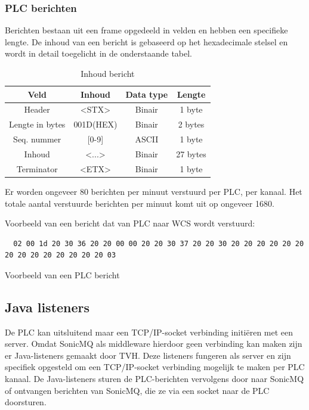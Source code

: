 \subsubsection{PLC berichten}
Berichten bestaan uit een frame opgedeeld in velden en hebben een specifieke lengte.
De inhoud van een bericht is gebaseerd op het hexadecimale stelsel en wordt in detail toegelicht in de onderstaande tabel.
\begin{table}[h!]
\centering 
\begin{tabular}{|c|c|c|c|}
  \hline
  \textbf{Veld} & \textbf{Inhoud} & \textbf{Data type} & \textbf{Lengte} \\
  \hline 
  Header & <STX> & Binair & 1 byte \\
  \hline 
  Lengte in bytes & 001D(HEX) & Binair & 2 bytes \\
  \hline 
  Seq. nummer &  [0-9] & ASCII & 1 byte  \\
  \hline 
  Inhoud & <...> & Binair & 27 bytes \\
  \hline 
  Terminator & <ETX> & Binair & 1 byte \\
  \hline
\end{tabular}
\caption[Message content]{\label{tab:message-content}Inhoud bericht}
\end{table}
\newpage

Er worden ongeveer 80 berichten per minuut verstuurd per PLC, per kanaal.
Het totale aantal verstuurde berichten per minuut komt uit op ongeveer 1680.

Voorbeeld van een bericht dat van PLC naar WCS wordt verstuurd: 
\begin{listing}[h!]
\begin{verbatim}
  02 00 1d 20 30 36 20 20 00 00 20 20 30 37 20 20 30 20 20 20 20 20 20 20 20 20 20 20 20 20 20 03
\end{verbatim}
\caption[Voorbeeld PLC bericht]{\label{listing:message_example}Voorbeeld van een PLC bericht}
\end{listing}

\subsection{Java listeners}
De PLC kan uitsluitend maar een TCP/IP-socket verbinding initiëren met een server.
Omdat SonicMQ als middleware hierdoor geen verbinding kan maken zijn er Java-listeners gemaakt door TVH.
Deze listeners fungeren als server en zijn specifiek opgesteld om een TCP/IP-socket verbinding mogelijk te maken per PLC kanaal.
De Java-listeners sturen de PLC-berichten vervolgens door naar SonicMQ of ontvangen berichten van SonicMQ, 
die ze via een socket naar de PLC doorsturen.


